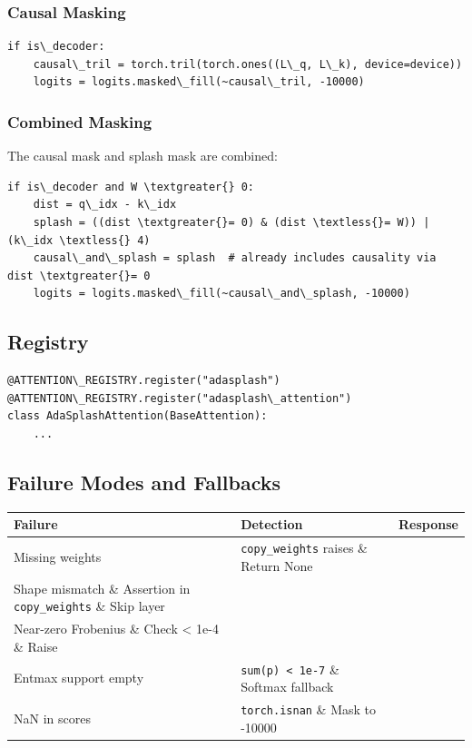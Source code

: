 \subsubsection{Causal Masking}

\begin{lstlisting}
if is\_decoder:
    causal\_tril = torch.tril(torch.ones((L\_q, L\_k), device=device))
    logits = logits.masked\_fill(~causal\_tril, -10000)
\end{lstlisting}

\subsubsection{Combined Masking}

The causal mask and splash mask are combined:

\begin{lstlisting}
if is\_decoder and W \textgreater{} 0:
    dist = q\_idx - k\_idx
    splash = ((dist \textgreater{}= 0) & (dist \textless{}= W)) | (k\_idx \textless{} 4)
    causal\_and\_splash = splash  # already includes causality via dist \textgreater{}= 0
    logits = logits.masked\_fill(~causal\_and\_splash, -10000)
\end{lstlisting}

\subsection{Registry}

\begin{lstlisting}
@ATTENTION\_REGISTRY.register("adasplash")
@ATTENTION\_REGISTRY.register("adasplash\_attention")
class AdaSplashAttention(BaseAttention):
    ...
\end{lstlisting}

\subsection{Failure Modes and Fallbacks}

\begin{table}[H]
\centering
\small
\begin{tabular}{lll}
\toprule
\textbf{Failure} & \textbf{Detection} & \textbf{Response} \\
\midrule
Missing weights & \texttt{copy\_weights} raises \& Return None \\
Shape mismatch \& Assertion in \texttt{copy\_weights} \& Skip layer \\
Near-zero Frobenius \& Check \textless{} 1e-4 \& Raise \\
Entmax support empty & \texttt{sum(p) \textless{} 1e-7} \& Softmax fallback \\
NaN in scores & \texttt{torch.isnan} \& Mask to -10000 \\
\bottomrule
\end{tabular}
\end{table}

